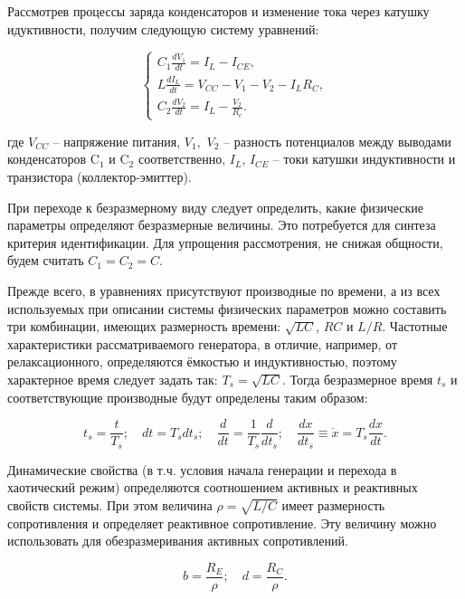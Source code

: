 \documentclass[a4paper,12pt]{article}
\begin{document}
Рассмотрев процессы заряда конденсаторов и изменение тока через
катушку идуктивности, получим следующую систему уравнений:

\begin{equation}
\label{atu:eq:colp_phys}
\begin{cases}
  C_1 \frac{dV_{1}}{dt}  = I_L - I_{CE} , \\
  L   \frac{dI_L}{dt}    = V_{CC} - V_{1} - V_{2} - I_L R_C , \\
  C_2 \frac{dV_{2}}{dt}  = I_L - \frac{V_{2}}{R_e}.
\end{cases}
\end{equation}


\noindent
где
$V_{CC} $ -- напряжение питания,
$V_1,$ $V_2$ -- разность потенциалов между выводами конденсаторов
$\mathrm{C}_1$ и $\mathrm{C}_2$ соответственно,
$I_L$, $I_{CE}$ -- токи катушки индуктивности и транзистора (коллектор-эмиттер).

При переходе к безразмерному виду следует определить,
какие физические параметры определяют безразмерные величины.
Это потребуется для синтеза критерия идентификации.
Для упрощения рассмотрения, не снижая общности,
будем считать $C_1 = C_2 = C$.

Прежде всего,
в уравнениях присутствуют производные по времени,
а из всех используемых при описании
системы физических параметров можно составить три
комбинации, имеющих размерность времени:
$ \sqrt{L C}$, $ R C $ и  $L/R$.
Частотные характеристики рассматриваемого генератора,
в отличие, например, от релаксационного,
определяются ёмкостью и индуктивностью,
поэтому характерное время следует задать так:
$ T_s = \sqrt{L C} $.
Тогда безразмерное время $t_s$
и соответствующие производные
будут определены таким образом:

\[
  t_s = \frac{t}{T_s}; \quad
  dt = T_s dt_s; \quad
  \frac{d}{dt} = \frac{1}{T_s} \frac{d}{dt_s}; \quad
  \frac{dx}{dt_s} \equiv \dot{x} = T_s \frac{dx}{dt} .
\]


Динамические свойства (в т.ч. условия начала генерации и перехода в хаотический режим) определяются
соотношением активных и реактивных свойств системы. При этом величина
$ \rho = \sqrt{L/C} $ имеет размерность сопротивления
и определяет реактивное сопротивление. Эту величину можно использовать
для обезразмеривания активных сопротивлений.

\[
  b = \frac{R_E}{\rho}; \quad
  d = \frac{R_C}{\rho}.
\]
\end{document}
